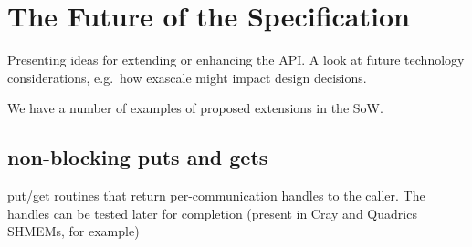 %
% 
% 
% 
% 
% 
% 
%


\chapter{The Future of the \openshmem Specification}

Presenting ideas for extending or enhancing the API.  A look at
future technology considerations, e.g.\ how exascale might impact
design decisions.

We have a number of examples of proposed extensions in the SoW.

\section{non-blocking puts and gets}

put/get routines that return per-communication handles to the
caller. The handles can be tested later for completion (present in
Cray and Quadrics SHMEMs, for example)

